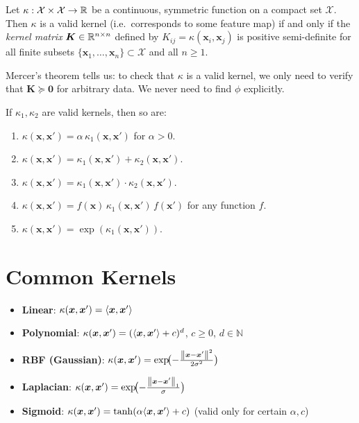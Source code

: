 \begin{theorem}
Let $\kappa:\mathcal{X}\times\mathcal{X}\to\mathbb{R}$ be a continuous, symmetric function on a compact set $\mathcal{X}$. Then $\kappa$ is a valid kernel (i.e.\ corresponds to some feature map) if and only if the \emph{kernel matrix} $\bm{K}\in\mathbb{R}^{n\times n}$ defined by $K_{ij}=\kappa(\bm{x}_i,\bm{x}_j)$ is positive semi-definite for all finite subsets $\{\bm{x}_1,\dots,\bm{x}_n\}\subset\mathcal{X}$ and all $n\geq 1$.
\end{theorem}

\begin{remark}
Mercer's theorem tells us: to check that $\kappa$ is a valid kernel, we only need to verify that $\bm{K}\succeq\bm{0}$ for arbitrary data. We never need to find $\phi$ explicitly.
\end{remark}

\begin{proposition}
If $\kappa_1,\kappa_2$ are valid kernels, then so are:
\begin{enumerate}
  \item $\kappa(\bm{x},\bm{x}') = \alpha\,\kappa_1(\bm{x},\bm{x}')$ for $\alpha>0$.
  \item $\kappa(\bm{x},\bm{x}') = \kappa_1(\bm{x},\bm{x}') + \kappa_2(\bm{x},\bm{x}')$.
  \item $\kappa(\bm{x},\bm{x}') = \kappa_1(\bm{x},\bm{x}')\cdot\kappa_2(\bm{x},\bm{x}')$.
  \item $\kappa(\bm{x},\bm{x}') = f(\bm{x})\,\kappa_1(\bm{x},\bm{x}')\,f(\bm{x}')$ for any function $f$.
  \item $\kappa(\bm{x},\bm{x}') = \exp(\kappa_1(\bm{x},\bm{x}'))$.
\end{enumerate}
\end{proposition}

\section{Common Kernels}

\begin{keyformulas}[title=\textbf{Standard Kernel Functions}]
\begin{itemize}
  \item \textbf{Linear}: $\kappa(\bm{x},\bm{x}')=\langle \bm{x}, \bm{x}' \rangle$
  \item \textbf{Polynomial}: $\kappa(\bm{x},\bm{x}')=(\langle \bm{x}, \bm{x}' \rangle+c)^d$, \quad $c\geq 0$, $d\in\mathbb{N}$
  \item \textbf{RBF (Gaussian)}: $\kappa(\bm{x},\bm{x}')=\exp\!\bigl(-\frac{\left\| \bm{x}-\bm{x}' \right\|^2}{2\sigma^2}\bigr)$
  \item \textbf{Laplacian}: $\kappa(\bm{x},\bm{x}')=\exp\!\bigl(-\frac{\left\| \bm{x}-\bm{x}' \right\|_1}{\sigma}\bigr)$
  \item \textbf{Sigmoid}: $\kappa(\bm{x},\bm{x}')=\tanh(\alpha\langle \bm{x}, \bm{x}' \rangle+c)$ \quad (valid only for certain $\alpha,c$)
\end{itemize}
\end{keyformulas}

